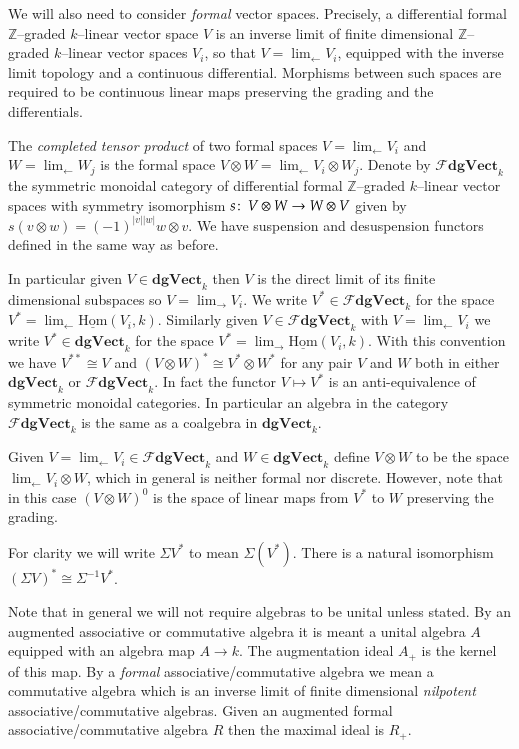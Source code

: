 \documentclass[british]{amsart}
\theoremstyle{plain}
\theoremstyle{definition}
{
\newaliascnt{{definition}}{theorem}\newtheorem{{definition}}[{definition}]{{Definition}}\aliascntresetthe{{definition}}\expandafterautorefname\endcsname{{Definition}}}
{
\newaliascnt{{remark}}{theorem}\newtheorem{{remark}}[{remark}]{{Remark}}\aliascntresetthe{{remark}}\expandafterautorefname\endcsname{{Remark}}}
{
\newaliascnt{{example}}{theorem}\newtheorem{{example}}[{example}]{{Example}}\aliascntresetthe{{example}}\expandafterautorefname\endcsname{{Example}}}
{
\newaliascnt{{examples}}{theorem}\newtheorem{{examples}}[{examples}]{{Examples}}\aliascntresetthe{{examples}}\expandafterautorefname\endcsname{{Examples}}}
{
\newaliascnt{{notation}}{theorem}\newtheorem{{notation}}[{notation}]{{Notation}}\aliascntresetthe{{notation}}\expandafterautorefname\endcsname{{Notation}}}
{
\newaliascnt{{convention}}{theorem}\newtheorem{{convention}}[{convention}]{{Convention}}\aliascntresetthe{{convention}}\expandafterautorefname\endcsname{{Convention}}}
\numberwithin{equation}{section}
\numberwithin{figure}{section}
\begin{document}
We will also need to consider \emph{formal} vector spaces. Precisely, a differential formal $\mathbb{Z}$--graded $k$--linear vector space $V$ is an inverse limit of finite dimensional $\mathbb{Z}$--graded $k$--linear vector spaces $V_i$, so that $V=\lim_{\leftarrow} V_i$, equipped with the inverse limit topology and a continuous differential. Morphisms between such spaces are required to be continuous linear maps preserving the grading and the differentials.

The \emph{completed tensor product} of two formal spaces $V=\lim_{\leftarrow} V_i$ and $W=\lim_{\leftarrow}W_j$ is the formal space $V \otimes W=\lim_{\leftarrow} V_i\otimes W_j$. Denote by ${\mathscr{F}{\mathbf{dgVect}_k}}$ the symmetric monoidal category of differential formal $\mathbb{Z}$--graded $k$--linear vector spaces with symmetry isomorphism $s{\colon\thinspace} V \otimes W\rightarrow W \otimes V$ given by $s(v \otimes w) = (-1)^{{\lvert {v} \rvert}{\lvert {w} \rvert}} w \otimes v$. We have suspension and desuspension functors defined in the same way as before.

In particular given $V\in{\mathbf{dgVect}_k}$ then $V$ is the direct limit of its finite dimensional subspaces so $V=\lim_{\rightarrow}V_i$. We write $V^*\in{\mathscr{F}{\mathbf{dgVect}_k}}$ for the space $V^*=\lim_{\leftarrow}\operatorname{\underline{Hom}}(V_i, k)$. Similarly given $V\in{\mathscr{F}{\mathbf{dgVect}_k}}$ with $V=\lim_{\leftarrow}V_i$ we write $V^*\in{\mathbf{dgVect}_k}$ for the space $V^*=\lim_{\rightarrow}\operatorname{\underline{Hom}}(V_i,k)$. With this convention we have $V^{**}\cong V$ and $(V\otimes W)^*\cong V^*\otimes W^*$ for any pair $V$ and $W$ both in either ${\mathbf{dgVect}_k}$ or ${\mathscr{F}{\mathbf{dgVect}_k}}$. In fact the functor $V\mapsto V^*$ is an anti-equivalence of symmetric monoidal categories. In particular an algebra in the category ${\mathscr{F}{\mathbf{dgVect}_k}}$ is the same as a coalgebra in ${\mathbf{dgVect}_k}$.

Given $V=\lim_\leftarrow V_i\in{\mathscr{F}{\mathbf{dgVect}_k}}$ and $W\in{\mathbf{dgVect}_k}$ define $V\otimes W$ to be the space $\lim_\leftarrow V_i\otimes W$, which in general is neither formal nor discrete. However, note that in this case $(V\otimes W)^0$ is the space of linear maps from $V^*$ to $W$ preserving the grading.

For clarity we will write $\Sigma V^*$ to mean $\Sigma (V^*)$. There is a natural isomorphism $(\Sigma V)^* \cong \Sigma^{-1} V^*$.

Note that in general we will not require algebras to be unital unless stated. By an augmented associative or commutative algebra it is meant a unital algebra $A$ equipped with an algebra map $A\rightarrow k$. The augmentation ideal $A_+$ is the kernel of this map. By a \emph{formal} associative/commutative algebra we mean a commutative algebra which is an inverse limit of finite dimensional \emph{nilpotent} associative/commutative algebras. Given an augmented formal associative/commutative algebra $R$ then the maximal ideal is $R_+$.
\end{document}

